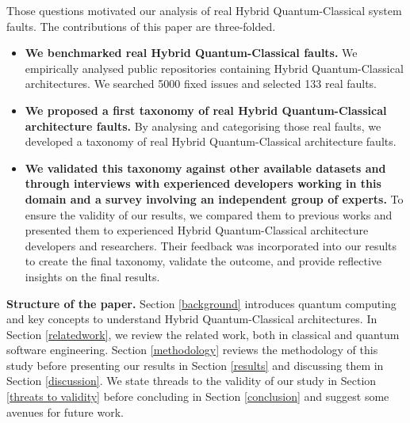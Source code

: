Those questions motivated our analysis of real Hybrid Quantum-Classical system faults. 
The contributions of this paper are three-folded.

\begin{itemize}\itemsep0em

\item  \textbf{We benchmarked real Hybrid Quantum-Classical faults.} We empirically analysed public repositories containing Hybrid Quantum-Classical architectures. We searched 5000 fixed issues and selected 133 real faults. 
\item  \textbf{We proposed a first taxonomy of real Hybrid Quantum-Classical architecture faults.} By analysing and categorising those real faults, we developed a taxonomy of real Hybrid Quantum-Classical architecture faults. 
\item  \textbf{We validated this taxonomy against other available datasets and through interviews with experienced developers working in this domain and a survey involving an independent group of experts.} To ensure the validity of our results, we compared them to previous works and presented them to experienced Hybrid Quantum-Classical architecture developers and  researchers. Their feedback was incorporated into our results to create the final taxonomy, validate the outcome, and provide reflective insights on the final results.
\end{itemize}

\noindent \textbf{Structure of the paper.} Section \ref{background} introduces quantum computing and key concepts to understand Hybrid Quantum-Classical architectures. In Section \ref{relatedwork}, we review the related work, both in classical and quantum software engineering. Section \ref{methodology} reviews the methodology of this study before presenting our results in Section \ref{results} and discussing them in Section \ref{discussion}. We state threads to the validity of our study in Section \ref{threats to validity} before concluding in Section \ref{conclusion} and suggest some avenues for future work.